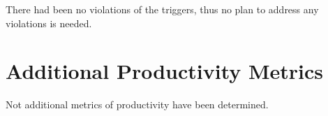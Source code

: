 \documentclass{article}
\begin{document}

There had been no violations of the triggers, thus no plan to address any violations is needed.


\section{Additional Productivity Metrics}

Not additional metrics of productivity have been determined. 
\end{document}
